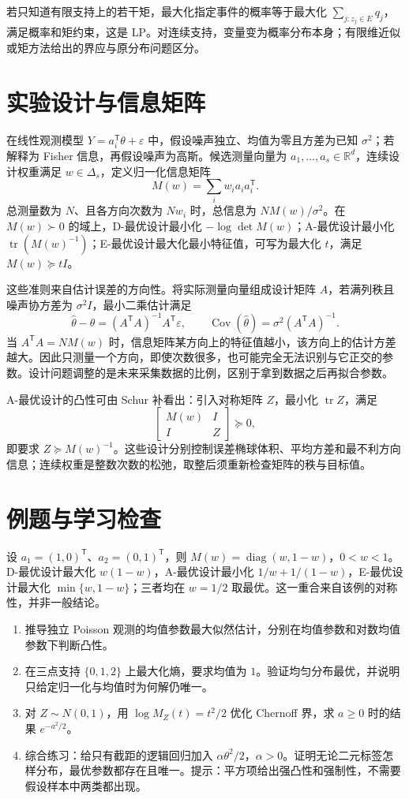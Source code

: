 \documentclass[UTF8,12pt,a4paper,fontset=fandol]{ctexbook}
\begin{document}
若只知道有限支持上的若干矩，最大化指定事件的概率等于最大化 $\sum_{j:z_j\in E}q_j$，满足概率和矩约束，这是 LP。对连续支持，变量变为概率分布本身；有限维近似或矩方法给出的界应与原分布问题区分。

\section{实验设计与信息矩阵}

在线性观测模型 $Y=a_i^{\mathsf T}\theta+\varepsilon$ 中，假设噪声独立、均值为零且方差为已知 $\sigma^2$；若解释为 Fisher 信息，再假设噪声为高斯。候选测量向量为 $a_1,\ldots,a_s\in\mathbb R^d$，连续设计权重满足 $w\in\Delta_s$，定义归一化信息矩阵
\[
 M(w)=\sum_iw_i a_i a_i^{\mathsf T}.
\]
总测量数为 $N$、且各方向次数为 $Nw_i$ 时，总信息为 $NM(w)/\sigma^2$。在 $M(w)\succ0$ 的域上，D-最优设计最小化 $-\log\det M(w)$；A-最优设计最小化 $\operatorname{tr}(M(w)^{-1})$；E-最优设计最大化最小特征值，可写为最大化 $t$，满足 $M(w)\succeq tI$。

这些准则来自估计误差的方向性。将实际测量向量组成设计矩阵 $A$，若满列秩且噪声协方差为 $\sigma^2I$，最小二乘估计满足
\[
 \widehat\theta-\theta=(A^{\mathsf T}A)^{-1}A^{\mathsf T}\varepsilon,
 \qquad
 \operatorname{Cov}(\widehat\theta)=\sigma^2(A^{\mathsf T}A)^{-1}.
\]
当 $A^{\mathsf T}A=NM(w)$ 时，信息矩阵某方向上的特征值越小，该方向上的估计方差越大。因此只测量一个方向，即使次数很多，也可能完全无法识别与它正交的参数。设计问题调整的是未来采集数据的比例，区别于拿到数据之后再拟合参数。

A-最优设计的凸性可由 Schur 补看出：引入对称矩阵 $Z$，最小化 $\operatorname{tr}Z$，满足
\[
 \begin{bmatrix}M(w)&I\\I&Z\end{bmatrix}\succeq0,
\]
即要求 $Z\succeq M(w)^{-1}$。这些设计分别控制误差椭球体积、平均方差和最不利方向信息；连续权重是整数次数的松弛，取整后须重新检查矩阵的秩与目标值。

\section{例题与学习检查}
\begin{example}[两个正交测量方向]
设 $a_1=(1,0)^{\mathsf T}$、$a_2=(0,1)^{\mathsf T}$，则 $M(w)=\operatorname{diag}(w,1-w)$，$0<w<1$。D-最优设计最大化 $w(1-w)$，A-最优设计最小化 $1/w+1/(1-w)$，E-最优设计最大化 $\min\{w,1-w\}$；三者均在 $w=1/2$ 取最优。这一重合来自该例的对称性，并非一般结论。
\end{example}
\begin{enumerate}
 \item 推导独立 Poisson 观测的均值参数最大似然估计，分别在均值参数和对数均值参数下判断凸性。
 \item 在三点支持 $\{0,1,2\}$ 上最大化熵，要求均值为 $1$。验证均匀分布最优，并说明只给定归一化与均值时为何解仍唯一。
 \item 对 $Z\sim N(0,1)$，用 $\log M_Z(t)=t^2/2$ 优化 Chernoff 界，求 $a\geq0$ 时的结果 $e^{-a^2/2}$。
 \item 综合练习：给只有截距的逻辑回归加入 $\alpha\theta^2/2$，$\alpha>0$。证明无论二元标签怎样分布，最优参数都存在且唯一。提示：平方项给出强凸性和强制性，不需要假设样本中两类都出现。
\end{enumerate}
\end{document}
